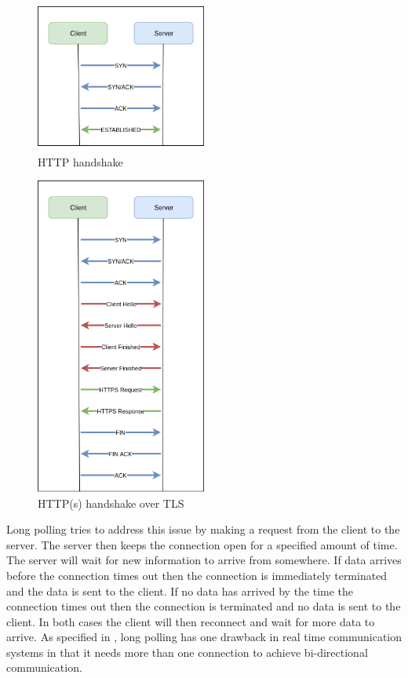 \begin{figure}[ht]
  \centering
    \includegraphics[width=0.5\textwidth]{figures/http-handshake.png}
    \caption{HTTP handshake}
    \label{fig:http-handshake}
\end{figure}

\begin{figure}[ht]
  \centering
    \includegraphics[width=0.5\textwidth]{figures/https-handshake.png}
    \caption{HTTP(s) handshake over TLS}
    \label{fig:https-handshake}
\end{figure}

Long polling tries to address this issue by making a request from the client to the server. The server then keeps the connection open for a specified amount of time. The server will wait for new information to arrive from somewhere. If data arrives before the connection times out then the connection is immediately terminated and the data is sent to the client. If no data has arrived by the time the connection times out then the connection is terminated and no data is sent to the client. In both cases the client will then reconnect and wait for more data to arrive. As specified in \cite{6364271}, long polling has one drawback in real time communication systems in that it needs more than one connection to achieve bi-directional communication.

